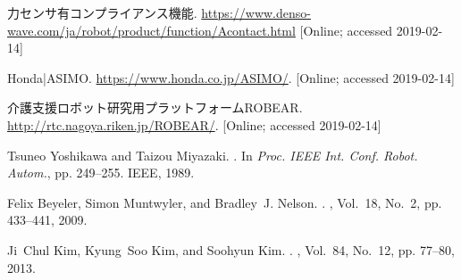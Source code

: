 \documentclass[usejistfm]{ieej}
\begin{document}
\begin{thebibliography}{10}
力センサ有コンプライアンス機能.
\url{https://www.denso-wave.com/ja/robot/product/function/Acontact.html}
[Online; accessed 2019-02-14] 

{Honda|ASIMO}.
\url{https://www.honda.co.jp/ASIMO/}.
[Online; accessed 2019-02-14] 

{介護支援ロボット研究用プラットフォームROBEAR}.
\url{http://rtc.nagoya.riken.jp/ROBEAR/}.
[Online; accessed 2019-02-14] 

Tsuneo Yoshikawa and Taizou Miyazaki.
.
\newblock In {\em Proc. IEEE Int. Conf. Robot. Autom.}, pp. 249--255. IEEE,
  1989.



Felix Beyeler, Simon Muntwyler, and Bradley~J. Nelson.
.
, Vol.~18, No.~2, pp. 433--441,
  2009.

Ji~Chul Kim, Kyung~Soo Kim, and Soohyun Kim.
.
, Vol.~84, No.~12, pp. 77--80, 2013.



\end{thebibliography}
\end{document}

